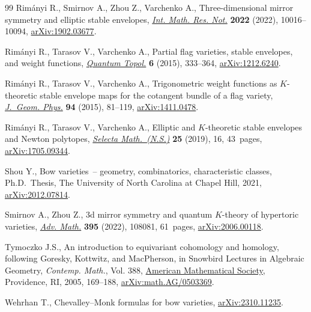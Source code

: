\documentclass[pdftex]{sigma}
\numberwithin{equation}{section}
\begin{document}
\begin{thebibliography}{99}
Rim\'anyi R., Smirnov A., Zhou Z., Varchenko A., Three-dimensional mirror
 symmetry and elliptic stable envelopes, \href{https://doi.org/10.1093/imrn/rnaa389}{\textit{Int. Math. Res. Not.}}
 \textbf{2022} (2022), 10016--10094, \href{https://arxiv.org/abs/1902.03677}{arXiv:1902.03677}.

Rim\'anyi R., Tarasov V., Varchenko A., Partial flag varieties, stable
 envelopes, and weight functions, \href{https://doi.org/10.4171/QT/65}{\textit{Quantum Topol.}} \textbf{6} (2015),
 333--364, \href{https://arxiv.org/abs/1212.6240}{arXiv:1212.6240}.

Rim\'anyi R., Tarasov V., Varchenko A., Trigonometric weight functions as
 {$K$}-theoretic stable envelope maps for the cotangent bundle of a flag
 variety, \href{https://doi.org/10.1016/j.geomphys.2015.04.002}{\textit{J.~Geom. Phys.}} \textbf{94} (2015), 81--119,
 \href{https://arxiv.org/abs/1411.0478}{arXiv:1411.0478}.

Rim\'anyi R., Tarasov V., Varchenko A., Elliptic and {$K$}-theoretic stable
 envelopes and {N}ewton polytopes, \href{https://doi.org/10.1007/s00029-019-0451-5}{\textit{Selecta Math.~(N.S.)}} \textbf{25}
 (2019), 16, 43~pages, \href{https://arxiv.org/abs/1705.09344}{arXiv:1705.09344}.

Shou Y., Bow varieties~-- geometry, combinatorics, characteristic classes, Ph.D.~Thesis, {T}he {U}niversity of North Carolina at Chapel Hill, 2021,
 \href{https://arxiv.org/abs/2012.07814}{arXiv:2012.07814}.

Smirnov A., Zhou Z., 3d mirror symmetry and quantum {$K$}-theory of hypertoric
 varieties, \href{https://doi.org/10.1016/j.aim.2021.108081}{\textit{Adv. Math.}} \textbf{395} (2022), 108081, 61~pages,
 \href{https://arxiv.org/abs/2006.00118}{arXiv:2006.00118}.

Tymoczko J.S., An introduction to equivariant cohomology and homology,
 following {G}oresky, {K}ottwitz, and {M}ac{P}herson, in Snowbird {L}ectures
 in {A}lgebraic {G}eometry, \textit{Contemp. Math.}, Vol. 388, \href{https://doi.org/10.1090/conm/388/07264}{American
 Mathematical Society}, Providence, RI, 2005, 169--188,
 \href{https://arxiv.org/abs/math.AG/0503369}{arXiv:math.AG/0503369}.

Wehrhan T., {C}hevalley--{M}onk formulas for bow varieties,
 \href{https://arxiv.org/abs/2310.11235}{arXiv:2310.11235}.

\end{thebibliography}\LastPageEnding
\end{document}
